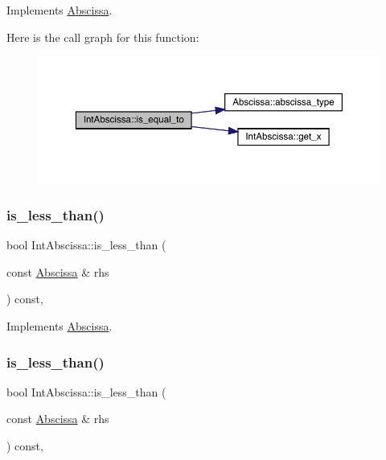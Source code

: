 Implements \mbox{\hyperlink{classAbscissa_a4adf4055c1eee010f9493e0ebb66348a}{Abscissa}}.

Here is the call graph for this function\+:
\nopagebreak
\begin{figure}[H]
\begin{center}
\leavevmode
\includegraphics[width=350pt]{d1/dd9/classIntAbscissa_a4d7663a45e6882b5d57dd59262d3900b_cgraph}
\end{center}
\end{figure}
\mbox{\label{classIntAbscissa_a8aba17c6dc640344c56cd520d6c28be2}} 
\subsubsection{\texorpdfstring{is\_less\_than()}{is\_less\_than()}\hspace{0.1cm}{\footnotesize\ttfamily [1/2]}}
{\footnotesize\ttfamily bool Int\+Abscissa\+::is\+\_\+less\+\_\+than (\begin{DoxyParamCaption}\item[{const \mbox{\hyperlink{classAbscissa}{Abscissa}} \&}]{rhs }\end{DoxyParamCaption}) const\hspace{0.3cm}{\ttfamily [inline]}, {\ttfamily [virtual]}}



Implements \mbox{\hyperlink{classAbscissa_a399c2f7a1309368b477c767ff5f63927}{Abscissa}}.

\mbox{\label{classIntAbscissa_a8aba17c6dc640344c56cd520d6c28be2}} 
\subsubsection{\texorpdfstring{is\_less\_than()}{is\_less\_than()}\hspace{0.1cm}{\footnotesize\ttfamily [2/2]}}
{\footnotesize\ttfamily bool Int\+Abscissa\+::is\+\_\+less\+\_\+than (\begin{DoxyParamCaption}\item[{const \mbox{\hyperlink{classAbscissa}{Abscissa}} \&}]{rhs }\end{DoxyParamCaption}) const\hspace{0.3cm}{\ttfamily [inline]}, {\ttfamily [virtual]}}




